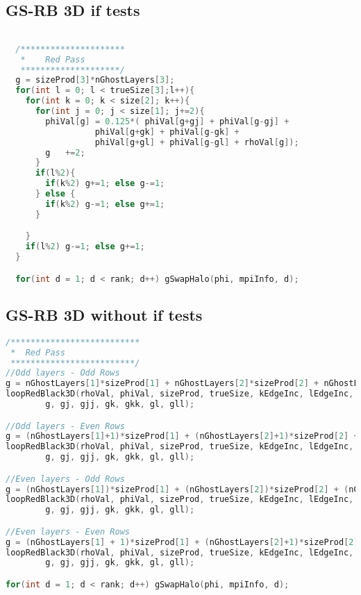 \subsection{GS-RB 3D if tests}
\label{sec:GS-RB_if}
\begin{lstlisting}[language=c, caption = GS-RB with if-tests]

  /*********************
   *	Red Pass
   ********************/
  g = sizeProd[3]*nGhostLayers[3];
  for(int l = 0; l < trueSize[3];l++){
    for(int k = 0; k < size[2]; k++){
      for(int j = 0; j < size[1]; j+=2){
        phiVal[g] = 0.125*(	phiVal[g+gj] + phiVal[g-gj] +
                  phiVal[g+gk] + phiVal[g-gk] +
                  phiVal[g+gl] + phiVal[g-gl] + rhoVal[g]);
        g	+=2;
      }
      if(l%2){
        if(k%2)	g+=1; else g-=1;
      } else {
        if(k%2) g-=1; else g+=1;
      }

    }
    if(l%2) g-=1; else g+=1;
  }

  for(int d = 1; d < rank; d++) gSwapHalo(phi, mpiInfo, d);
\end{lstlisting}

\newpage
\subsection{GS-RB 3D without if tests}
\begin{lstlisting}[language=c, caption = main routine]
/**************************
 *	Red Pass
 *************************/
//Odd layers - Odd Rows
g = nGhostLayers[1]*sizeProd[1] + nGhostLayers[2]*sizeProd[2] + nGhostLayers[3]*sizeProd[3];
loopRedBlack3D(rhoVal, phiVal, sizeProd, trueSize, kEdgeInc, lEdgeInc,
        g, gj, gjj, gk, gkk, gl, gll);

//Odd layers - Even Rows
g = (nGhostLayers[1]+1)*sizeProd[1] + (nGhostLayers[2]+1)*sizeProd[2] + nGhostLayers[3]*sizeProd[3];
loopRedBlack3D(rhoVal, phiVal, sizeProd, trueSize, kEdgeInc, lEdgeInc,
        g, gj, gjj, gk, gkk, gl, gll);

//Even layers - Odd Rows
g = (nGhostLayers[1])*sizeProd[1] + (nGhostLayers[2])*sizeProd[2] + (nGhostLayers[3]+1)*sizeProd[3];
loopRedBlack3D(rhoVal, phiVal, sizeProd, trueSize, kEdgeInc, lEdgeInc,
        g, gj, gjj, gk, gkk, gl, gll);

//Even layers - Even Rows
g = (nGhostLayers[1] + 1)*sizeProd[1] + (nGhostLayers[2]+1)*sizeProd[2] + (nGhostLayers[3]+1)*sizeProd[3];
loopRedBlack3D(rhoVal, phiVal, sizeProd, trueSize, kEdgeInc, lEdgeInc,
        g, gj, gjj, gk, gkk, gl, gll);

for(int d = 1; d < rank; d++) gSwapHalo(phi, mpiInfo, d);
\end{lstlisting}


